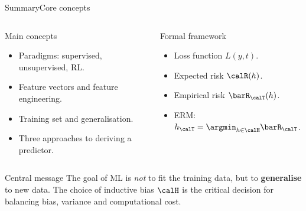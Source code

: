 \begin{frame}{Summary}{Core concepts}
  \begin{columns}[T]
    \begin{block}{Main concepts}
      \begin{itemize}
        \item Paradigms: supervised, unsupervised, RL.
        \item Feature vectors and feature engineering.
        \item Training set and generalisation.
        \item Three approaches to deriving a predictor.
      \end{itemize}
    \end{block}
    \begin{block}{Formal framework}
      \begin{itemize}
        \item Loss function $L(y, t)$.
        \item Expected risk $\calR(h)$.
        \item Empirical risk $\barR_\calT(h)$.
        \item ERM: $h_\calT = \argmin_{h \in \calH} \barR_\calT$.
      \end{itemize}
    \end{block}
  \end{columns}
  \bigskip
  \begin{alertblock}{Central message}
    The goal of ML is \emph{not} to fit the training data, but to
    \textbf{generalise} to new data.
    The choice of inductive bias $\calH$ is the critical decision for balancing bias,
    variance and computational cost.
  \end{alertblock}
\end{frame}

